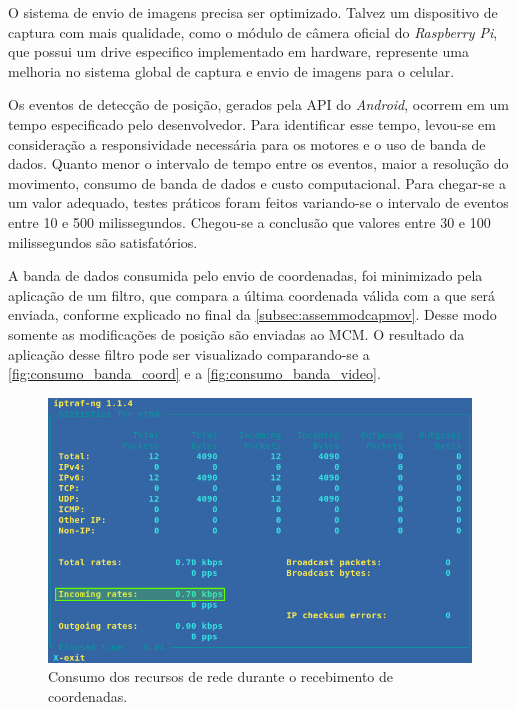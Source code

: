 O sistema de envio de imagens precisa ser optimizado. Talvez um dispositivo de captura com mais qualidade, como o módulo de câmera oficial do \textit{Raspberry Pi}, que possui um drive especifico implementado em hardware, represente uma melhoria no sistema global de captura e envio de imagens para o celular.\par

Os eventos de detecção de posição, gerados pela API do \textit{Android}, ocorrem em um tempo especificado pelo desenvolvedor. Para identificar esse tempo, levou-se em consideração a responsividade necessária para os motores e o uso de banda de dados. Quanto menor o intervalo de tempo entre os eventos, maior a resolução do movimento,  consumo de banda de dados e custo computacional. Para chegar-se a um valor adequado, testes práticos foram feitos variando-se o intervalo de eventos entre 10 e 500 milissegundos. Chegou-se a conclusão que valores entre 30 e 100 milissegundos são satisfatórios.\par

A banda de dados consumida pelo envio de coordenadas, foi minimizado pela aplicação de um filtro, que compara a última coordenada válida com a que será enviada, conforme explicado no final da \autoref{subsec:assemmodcapmov}. Desse modo somente as modificações de posição são enviadas ao MCM. O resultado da aplicação desse filtro pode ser visualizado comparando-se a \autoref{fig:consumo_banda_coord} e a \autoref{fig:consumo_banda_video}.\par

\begin{figure}[H]
	\centering
	\includegraphics[width=1\textwidth]{figuras/consumo_banda.jpg}
	\caption{Consumo dos recursos de rede durante o recebimento de coordenadas.}
	\label{fig:consumo_banda_coord}
\end{figure}

